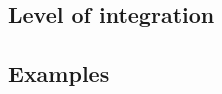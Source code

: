 \documentclass[presentation]{beamer} %
\begin{document}
\subsection{Level of integration}
\subsection{Examples}



\section*{\refname}
\begin{frame}[allowframebreaks]
  \frametitle{\refname}
  \scriptsize
  
  
\end{frame}
\section*{\refname}
\end{document}
